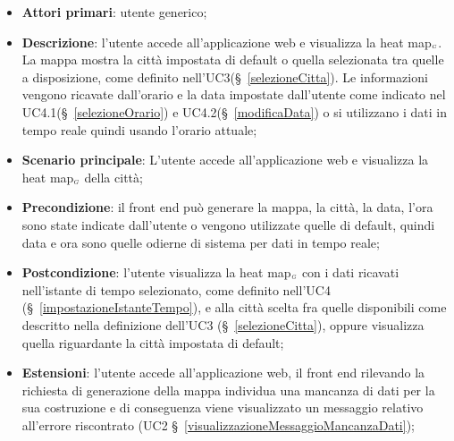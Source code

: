 \begin{itemize}
	\item \textbf{Attori primari}: utente generico;
	\item \textbf{Descrizione}: l’utente accede all’applicazione web e visualizza la heat map$_{\scaleto{G}{3pt}}$. La mappa mostra la città impostata di default o quella selezionata tra quelle a disposizione, come definito nell’UC3(\S~\ref{selezioneCitta}). Le informazioni vengono ricavate dall’orario e la data impostate dall’utente come indicato nel UC4.1(\S~\ref{selezioneOrario}) e UC4.2(\S~\ref{modificaData}) o si utilizzano i dati in tempo reale quindi usando l’orario attuale;
	\item \textbf{Scenario principale}: L’utente accede all’applicazione web e visualizza la heat map$_{\scaleto{G}{3pt}}$ della città;
	\item \textbf{Precondizione}: il front end può generare la mappa, la città, la data, l’ora sono state indicate dall’utente o vengono utilizzate quelle di default, quindi data e ora sono quelle odierne di sistema per dati in tempo reale;
	\item \textbf{Postcondizione}: l’utente visualizza la heat map$_{\scaleto{G}{3pt}}$ con i dati ricavati nell’istante di tempo selezionato, come definito nell’UC4 (\S~\ref{impostazioneIstanteTempo}), e alla città scelta fra quelle disponibili come descritto nella definizione dell’UC3 (\S~\ref{selezioneCitta}), oppure visualizza quella riguardante la città impostata di default;
	\item \textbf{Estensioni}: l’utente accede all’applicazione web, il front end rilevando la richiesta di generazione della mappa individua una mancanza di dati per la sua costruzione e di conseguenza viene visualizzato un messaggio relativo all’errore riscontrato (UC2 \S~\ref{visualizzazioneMessaggioMancanzaDati});
\end{itemize}

